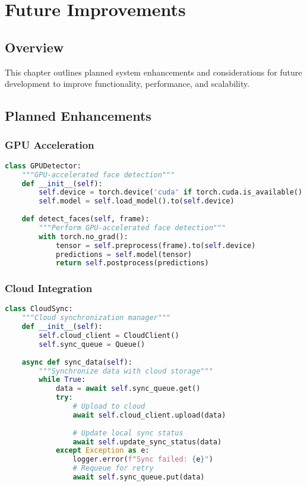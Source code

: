 \chapter{Future Improvements}

\section{Overview}
This chapter outlines planned system enhancements and considerations for future development to improve functionality, performance, and scalability.

\section{Planned Enhancements}

\subsection{GPU Acceleration}
\begin{lstlisting}[language=Python]
class GPUDetector:
    """GPU-accelerated face detection"""
    def __init__(self):
        self.device = torch.device('cuda' if torch.cuda.is_available() else 'cpu')
        self.model = self.load_model().to(self.device)
        
    def detect_faces(self, frame):
        """Perform GPU-accelerated face detection"""
        with torch.no_grad():
            tensor = self.preprocess(frame).to(self.device)
            predictions = self.model(tensor)
            return self.postprocess(predictions)
\end{lstlisting}

\subsection{Cloud Integration}
\begin{lstlisting}[language=Python]
class CloudSync:
    """Cloud synchronization manager"""
    def __init__(self):
        self.cloud_client = CloudClient()
        self.sync_queue = Queue()
        
    async def sync_data(self):
        """Synchronize data with cloud storage"""
        while True:
            data = await self.sync_queue.get()
            try:
                # Upload to cloud
                await self.cloud_client.upload(data)
                
                # Update local sync status
                await self.update_sync_status(data)
            except Exception as e:
                logger.error(f"Sync failed: {e}")
                # Requeue for retry
                await self.sync_queue.put(data)
\end{lstlisting}

